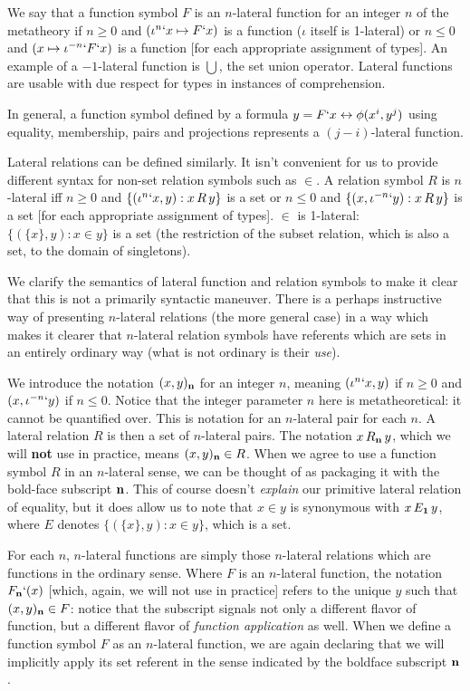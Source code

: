 \documentclass[12pt]{article}
\begin{document}
We say that a function symbol $F$ is an $n$-lateral function for an integer $n$ of the metatheory  if $n\geq 0$ and $(\iota^n`x \mapsto F`x)$ is a function ($\iota$ itself is 1-lateral)
or $n\leq 0$ and $(x \mapsto \iota^{-n}`F`x)$ is a function [for each appropriate assignment of types]. An example of a $-1$-lateral function is $\bigcup$, the set union operator.   Lateral functions are usable with due respect for types in instances of comprehension.

In general, a function symbol defined by a formula $y = F`x \leftrightarrow \phi(x^i,y^j)$ using equality, membership, pairs and projections represents a $(j-i)$-lateral function.

Lateral relations can be defined similarly.  It isn't convenient for us to provide different syntax for non-set relation symbols such as $\in$.  A relation symbol
$R$ is $n$-lateral iff $n \geq 0$ and $\{(\iota^n`x,y):x \, R\, y\}$ is a set or $n \leq 0$ and $\{(x,\iota^{-n}`y):x \, R\, y\}$ is a set [for each appropriate assignment of types].  $\in$ is 1-lateral:  $\{(\{x\},y):x \in y\}$ is a set (the restriction of the subset relation, which is also a set, to the domain of singletons).

We clarify the semantics of lateral function and relation symbols to make it clear that this is not a primarily syntactic maneuver.  There is a perhaps instructive way of presenting $n$-lateral relations (the more general case) in a way which makes it clearer that $n$-lateral relation symbols have referents which are sets in an entirely ordinary way (what is not ordinary is their {\em use\/}).

We introduce the notation $(x,y)_{\bf n}$ for an integer $n$, meaning $(\iota^n`x,y)$ if $n\geq0$ and $(x,\iota^{-n}`y)$ if $n\leq 0$.  Notice that the integer parameter $n$ here is metatheoretical:  it cannot be quantified over.  This is notation for an $n$-lateral pair for each $n$.  A lateral relation $R$ is then a set of $n$-lateral pairs.  The notation $x \, R_{\bf n} \, y$, which we will {\bf not} use in practice, means $(x,y)_{\bf n} \in R$.  When we agree to use a function symbol $R$ in an $n$-lateral sense, we can be thought of as packaging it with the bold-face subscript ${\bf n}$.  This of course doesn't {\em explain\/} our primitive lateral relation of equality, but it does allow us to note that $x \in y$ is synonymous with $x \, E_{\bf 1} \, y$, where
$E$ denotes $\{(\{x\},y):x \in y\}$, which is a set.  

For each $n$, $n$-lateral functions are simply those $n$-lateral relations which are functions in the ordinary sense.  Where $F$ is an $n$-lateral function, the notation
$F_{\bf n}`(x)$ [which, again, we will not use in practice] refers to the unique $y$ such that $(x,y)_{\bf n}\in F$:  notice that the subscript  signals not only  a different flavor of function, but a different flavor of {\em function application\/} as well.   When we define a function symbol $F$ as an $n$-lateral function, we are again declaring that we will implicitly apply its set referent  in the sense
indicated by the boldface subscript ${\bf n}$.
\end{document}
